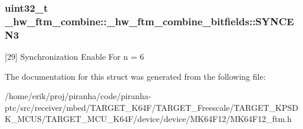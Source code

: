 \subsubsection[{\texorpdfstring{S\+Y\+N\+C\+E\+N3}{SYNCEN3}}]{\setlength{\rightskip}{0pt plus 5cm}uint32\+\_\+t \+\_\+hw\+\_\+ftm\+\_\+combine\+::\+\_\+hw\+\_\+ftm\+\_\+combine\+\_\+bitfields\+::\+S\+Y\+N\+C\+E\+N3}\hypertarget{struct__hw__ftm__combine_1_1__hw__ftm__combine__bitfields_ad383770c55624e4faa531626d3767dfd}{}\label{struct__hw__ftm__combine_1_1__hw__ftm__combine__bitfields_ad383770c55624e4faa531626d3767dfd}
\mbox{[}29\mbox{]} Synchronization Enable For n = 6 

The documentation for this struct was generated from the following file\+:\begin{DoxyCompactItemize}
\item 
/home/erik/proj/piranha/code/piranha-\/ptc/src/receiver/mbed/\+T\+A\+R\+G\+E\+T\+\_\+\+K64\+F/\+T\+A\+R\+G\+E\+T\+\_\+\+Freescale/\+T\+A\+R\+G\+E\+T\+\_\+\+K\+P\+S\+D\+K\+\_\+\+M\+C\+U\+S/\+T\+A\+R\+G\+E\+T\+\_\+\+M\+C\+U\+\_\+\+K64\+F/device/device/\+M\+K64\+F12/M\+K64\+F12\+\_\+ftm.\+h\end{DoxyCompactItemize}
